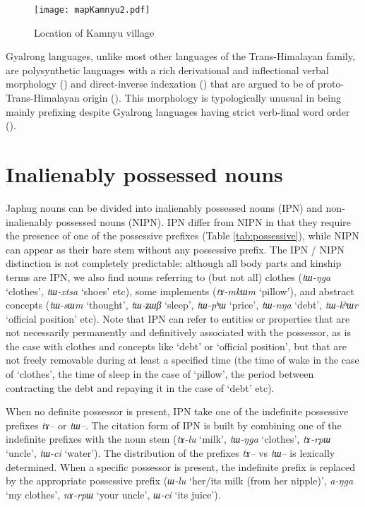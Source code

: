 \documentclass[oldfontcommands,oneside,a4paper,11pt]{article}
\newcommand{\ipa}[1]{{\phon\textit{#1}}} %
\begin{document}
\begin{figure}[H]
\centering
\label{fig:kamnyu}
\caption{Location of Kamnyu village}
\texttt{[image: mapKamnyu2.pdf]}
\end{figure}

Gyalrong languages, unlike most other languages of the Trans-Himalayan family, are polysynthetic languages with a rich derivational and inflectional verbal morphology (\citealt{jacques12incorp, jackson14morpho}) and direct-inverse indexation (\citealt{delancey81direction, jackson02rentongdengdi, jacques10inverse, gongxun14agreement}) that are argued to be of proto-Trans-Himalayan origin (\citealt{delancey10agreement, jacques12agreement}). This morphology is typologically unusual in being mainly prefixing despite Gyalrong languages having strict verb-final word order (\citealt{jacques13harmonization}).

 \section{Inalienably possessed nouns} 
Japhug nouns can be divided into inalienably possessed nouns (IPN) and non-inalienably possessed nouns (NIPN). IPN differ from NIPN in that they require the presence of one of the possessive prefixes (Table \ref{tab:possessive}), while NIPN can appear as their bare stem without any possessive prefix. The IPN / NIPN distinction is not completely predictable: although all body parts and kinship terms are IPN, we also find nouns referring to (but not all) clothes (\ipa{tɯ-ŋga} `clothes', \ipa{tɯ-xtsa} `shoes' etc), some implements (\ipa{tɤ-mkɯm} `pillow'), and abstract concepts (\ipa{tɯ-sɯm} `thought', \ipa{tɯ-ʑɯβ} `sleep', \ipa{tɯ-pʰɯ} `price', \ipa{tɯ-nŋa} `debt', \ipa{tɯ-kʰɯr} `official position' etc). Note that IPN can refer to entities or properties that are not necessarily permanently and definitively associated with the possessor, as is the case with clothes and concepts like `debt' or `official position', but that are not freely removable during at least a specified time (the time of wake in the case of `clothes', the time of sleep in the case of `pillow', the period between contracting the debt and repaying it in the case of `debt' etc).

When no definite possessor is present, IPN take one of the indefinite possessive prefixes \ipa{tɤ--} or \ipa{tɯ--}. The citation form of IPN is built by combining one of the indefinite prefixes with the noun stem (\ipa{tɤ-lu} `milk', \ipa{tɯ-ŋga} `clothes', \ipa{tɤ-rpɯ} `uncle', \ipa{tɯ-ci} `water'). The distribution of the prefixes \ipa{tɤ--} vs \ipa{tɯ--} is lexically determined.  When a specific possessor is present, the indefinite prefix is replaced by the appropriate possessive prefix (\ipa{ɯ-lu} `her/its milk (from her nipple)', \ipa{a-ŋga} `my clothes', \ipa{nɤ-rpɯ} `your uncle', \ipa{ɯ-ci} `its juice'). 
\end{document}

